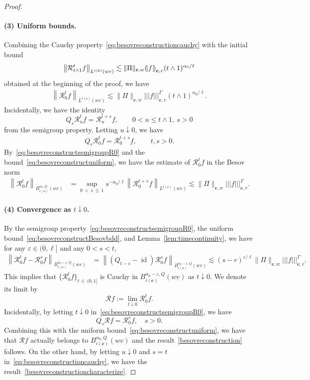 \documentclass[AHL,Unicode,longabstracts,published]{cedram}
\newcommand{\bfc}{\mathbf{c}}
\newcommand{\mcR}{\mathcal{R}}
\DeclareMathOperator{\id}{id}
\newcommand{\tri}{|\!|\!|}
\newcommand{\llparenthesis}{\mathopen{(\mkern -2.7mu|}}
\newcommand{\rrparenthesis}{\mathclose{|\mkern -2.7mu)}}
\newcommand{\lp}{\llparenthesis}
\newcommand{\rp}{\rrparenthesis}
\begin{document}
\begin{proof}
\paragraph*{(3) Uniform bounds.} Combining the Cauchy property~\eqref{eq:besovreconstructioncauchy} with the initial bound
\[
\left\|\mcR_{t\wedge1}^tf\right\|_{L^{i(\bfc)}(wv)}\lesssim\|\Pi\|_{\bfc,w}\lp f\rp_{\bfc,v}(t\wedge1)^{\alpha_0/\ell}
\]
obtained at the beginning of the proof, we have
\begin{align}\label{eq:besovreconstructuniform}
\left\|\mcR_0^tf\right\|_{L^{i(\bfc)}(wv)}
\lesssim\|\Pi\|_{\bfc,w}\tri f \tri_{\bfc,v}^\Gamma(t\wedge1)^{\alpha_0/\ell}.
\end{align}
Incidentally, we have the identity
\[
Q_s\mcR_u^tf=\mcR_u^{t+s}f,\qquad 0<u\le t\wedge1,\ s>0
\]
from the semigroup property. Letting $u\downarrow0$, we have
\begin{align}\label{eq:besovreconstructsemigroupR0}
Q_s\mcR_0^tf=\mcR_0^{t+s}f,\qquad t,s>0.
\end{align}
By~\eqref{eq:besovreconstructsemigroupR0} and the bound~\eqref{eq:besovreconstructuniform}, we have the estimate of $\mcR_0^tf$ in the Besov norm
\begin{align}\label{eq:besovreconstructBesovbdd}
\left\|\mcR_0^tf\right\|_{B_{i(\bfc)}^{\alpha_0,Q}(wv)} &=\sup_{0\,<\,s\,\le\,1}s^{-\alpha_0/\ell}\left\|\mcR_0^{t+s}f\right\|_{L^{i(\bfc)}(wv)}
\lesssim\|\Pi\|_{\bfc,w}\tri f \tri_{\bfc,v}^\Gamma.
\end{align}


\paragraph*{(4) Convergence as $t\downarrow0$.}
By the semigroup property~\eqref{eq:besovreconstructsemigroupR0}, the uniform bound~\eqref{eq:besovreconstructBesovbdd}, and Lemma~\ref{lem:timecontinuity}, we have for any $\varepsilon\in(0,\ell]$ and any $0<s<t$,
\begin{align*}
\left\|\mcR_0^tf-\mcR_0^sf\right\|_{B_{i(\bfc)}^{\alpha_0-\varepsilon,Q}(wv)} &=\left\|(Q_{t-s}-\id)\mcR_0^sf\right\|_{B_{i(\bfc)}^{\alpha_0-\varepsilon,Q}(wv)}
\lesssim(s-r)^{\varepsilon/\ell}\|\Pi\|_{\bfc,w}\tri f \tri_{\bfc,v}^\Gamma.
\end{align*}
This implies that $\{\mcR_0^tf\}_{t\,\in\,(0,1]}$ is Cauchy in $B_{i(\bfc)}^{\alpha_0-\varepsilon,Q}(wv)$ as $t\downarrow0$. We denote its limit by
\[
\mcR f:=\lim_{t\downarrow0}\mcR_0^tf.
\]
Incidentally, by letting $t\downarrow0$ in~\eqref{eq:besovreconstructsemigroupR0}, we have
\[
Q_s\mcR f=\mcR_0^sf,\quad s>0.
\]
Combining this with the uniform bound~\eqref{eq:besovreconstructuniform}, we have that $\mcR f$ actually belongs to $B_{i(\bfc)}^{\alpha_0,Q}(wv)$ and the result~\eqref{besovreconstruction} follows. On the other hand, by letting $u\downarrow0$ and $s=t$ in~\eqref{eq:besovreconstructioncauchy}, we have the result~\eqref{besovreconstructioncharacterize}.


\end{proof}
\end{document}
